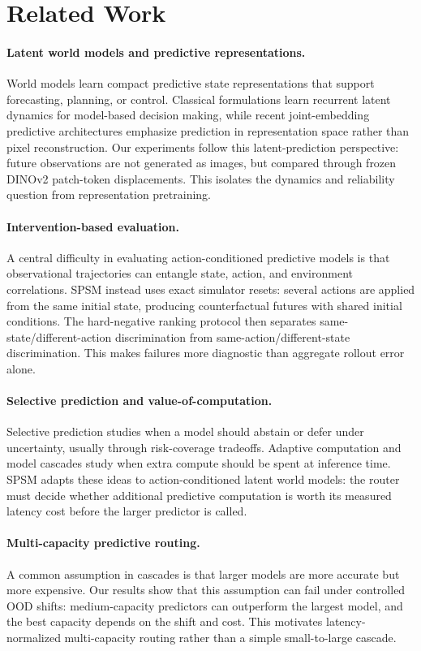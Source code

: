 \section{Related Work}

\paragraph{Latent world models and predictive representations.}
World models learn compact predictive state representations that support forecasting, planning, or control. Classical formulations learn recurrent latent dynamics for model-based decision making, while recent joint-embedding predictive architectures emphasize prediction in representation space rather than pixel reconstruction. Our experiments follow this latent-prediction perspective: future observations are not generated as images, but compared through frozen DINOv2 patch-token displacements. This isolates the dynamics and reliability question from representation pretraining.

\paragraph{Intervention-based evaluation.}
A central difficulty in evaluating action-conditioned predictive models is that observational trajectories can entangle state, action, and environment correlations. SPSM instead uses exact simulator resets: several actions are applied from the same initial state, producing counterfactual futures with shared initial conditions. The hard-negative ranking protocol then separates same-state/different-action discrimination from same-action/different-state discrimination. This makes failures more diagnostic than aggregate rollout error alone.

\paragraph{Selective prediction and value-of-computation.}
Selective prediction studies when a model should abstain or defer under uncertainty, usually through risk-coverage tradeoffs. Adaptive computation and model cascades study when extra compute should be spent at inference time. SPSM adapts these ideas to action-conditioned latent world models: the router must decide whether additional predictive computation is worth its measured latency cost before the larger predictor is called.

\paragraph{Multi-capacity predictive routing.}
A common assumption in cascades is that larger models are more accurate but more expensive. Our results show that this assumption can fail under controlled OOD shifts: medium-capacity predictors can outperform the largest model, and the best capacity depends on the shift and cost. This motivates latency-normalized multi-capacity routing rather than a simple small-to-large cascade.
